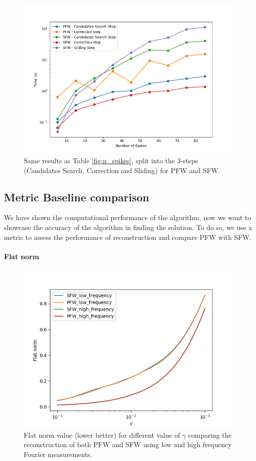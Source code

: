 \documentclass[a4paper,12pt,oneside]{report}
\theoremstyle{named}
\begin{document}
\begin{figure}
\centering
\includegraphics[width=1\linewidth]{n_spikes2.png}
\caption{Same results as Table \ref{fig:n_spikes}, split into the 3-steps (Candidates Search, Correction and Sliding) for PFW and SFW.}
\label{fig:n_spikes2}
\end{figure}

\subsection{Metric Baseline comparison}
We have shown the computational performance of the algorithm, now we want to showcase the accuracy of the algorithm in finding the solution. To do so, we use a metric to assess the performance of reconstruction and compare PFW with SFW.

\paragraph{Flat norm}
\begin{figure}
\centering
\includegraphics[width=0.9\linewidth]{falt_norm.png}
\caption{Flat norm value (lower better) for different value of $\gamma$ comparing the reconstruction of both PFW and SFW using low and high frequency Fourier measurements.}
\label{fig:flat_norm}
\end{figure}
\end{document}
